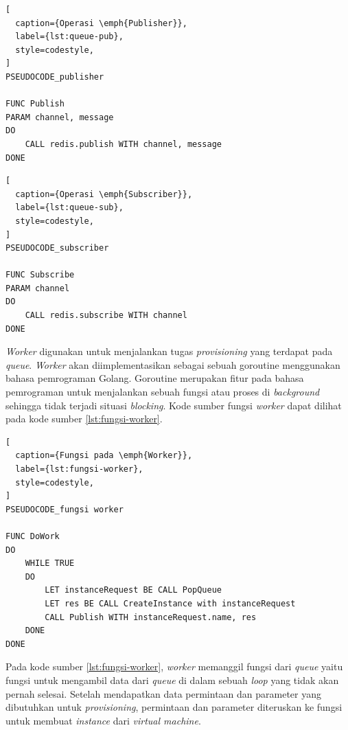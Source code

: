 \begin{lstlisting}[
  caption={Operasi \emph{Publisher}},
  label={lst:queue-pub},
  style=codestyle,
]
PSEUDOCODE_publisher

FUNC Publish
PARAM channel, message
DO
    CALL redis.publish WITH channel, message
DONE
\end{lstlisting}

\begin{lstlisting}[
  caption={Operasi \emph{Subscriber}},
  label={lst:queue-sub},
  style=codestyle,
]
PSEUDOCODE_subscriber

FUNC Subscribe
PARAM channel
DO
    CALL redis.subscribe WITH channel
DONE
\end{lstlisting}

\emph{Worker} digunakan untuk menjalankan tugas \emph{provisioning}
yang terdapat pada \emph{queue}. \emph{Worker} akan diimplementasikan
sebagai sebuah goroutine menggunakan bahasa pemrograman Golang. Goroutine merupakan
fitur pada bahasa pemrograman untuk menjalankan sebuah fungsi atau proses
di \emph{background} sehingga tidak terjadi situasi \emph{blocking}. Kode sumber
fungsi \emph{worker} dapat dilihat pada kode sumber \ref{lst:fungsi-worker}.

\clearpage

\begin{lstlisting}[
  caption={Fungsi pada \emph{Worker}},
  label={lst:fungsi-worker},
  style=codestyle,
]
PSEUDOCODE_fungsi worker

FUNC DoWork
DO
    WHILE TRUE
    DO
        LET instanceRequest BE CALL PopQueue
        LET res BE CALL CreateInstance with instanceRequest
        CALL Publish WITH instanceRequest.name, res
    DONE
DONE
\end{lstlisting}

Pada kode sumber \ref{lst:fungsi-worker}, \emph{worker} memanggil fungsi
dari \emph{queue} yaitu fungsi untuk mengambil data dari \emph{queue}
di dalam sebuah \emph{loop} yang tidak akan pernah selesai. Setelah
mendapatkan data permintaan dan parameter yang dibutuhkan untuk \emph{provisioning},
permintaan dan parameter diteruskan ke fungsi untuk membuat \emph{instance}
dari \emph{virtual machine}.

%


